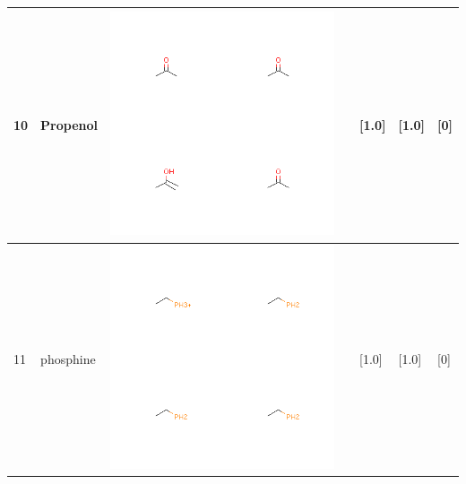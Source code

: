 \begin{longtable}{|l|l|l|l|l|l|l|}
\hline
10 & Propenol & \includegraphics[scale=0.6]{PropenolMV.png} & & [1.0]& [1.0] & [0] \\
\hline
11 & phosphine & \includegraphics[scale=0.6]{phosphineMV.png} & & [1.0]& [1.0] & [0] \\
\hline

\end{longtable}

